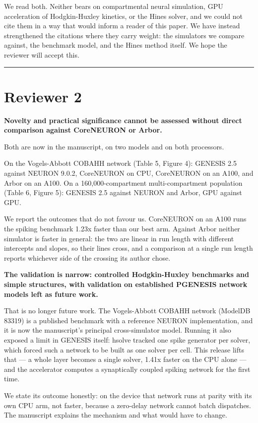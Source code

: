 \documentclass[11pt,a4paper]{article}
\begin{document}
We read both. Neither bears on compartmental neural simulation, GPU acceleration of Hodgkin-Huxley kinetics, or the Hines solver, and we could not cite them in a way that would inform a reader of this paper. We have instead strengthened the citations where they carry weight: the simulators we compare against, the benchmark model, and the Hines method itself. We hope the reviewer will accept this.

\medskip\hrule\medskip

\section*{Reviewer 2}

\textbf{Novelty and practical significance cannot be assessed without direct comparison against CoreNEURON or Arbor.}

Both are now in the manuscript, on two models and on both processors.

On the Vogels-Abbott COBAHH network (Table 5, Figure 4): GENESIS 2.5 against NEURON 9.0.2, CoreNEURON on CPU, CoreNEURON on an A100, and Arbor on an A100. On a 160,000-compartment multi-compartment population (Table 6, Figure 5): GENESIS 2.5 against NEURON and Arbor, GPU against GPU.

We report the outcomes that do not favour us. CoreNEURON on an A100 runs the spiking benchmark 1.23x faster than our best arm. Against Arbor neither simulator is faster in general: the two are linear in run length with different intercepts and slopes, so their lines cross, and a comparison at a single run length reports whichever side of the crossing its author chose.

\textbf{The validation is narrow: controlled Hodgkin-Huxley benchmarks and simple structures, with validation on established PGENESIS network models left as future work.}

That is no longer future work. The Vogels-Abbott COBAHH network (ModelDB 83319) is a published benchmark with a reference NEURON implementation, and it is now the manuscript's principal cross-simulator model. Running it also exposed a limit in GENESIS itself: hsolve tracked one spike generator per solver, which forced such a network to be built as one solver per cell. This release lifts that --- a whole layer becomes a single solver, 1.41x faster on the CPU alone --- and the accelerator computes a synaptically coupled spiking network for the first time.

We state its outcome honestly: on the device that network runs at parity with its own CPU arm, not faster, because a zero-delay network cannot batch dispatches. The manuscript explains the mechanism and what would have to change.
\end{document}
